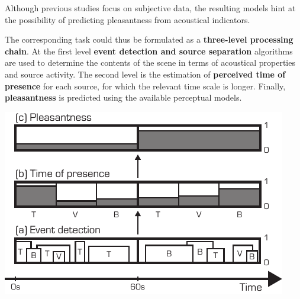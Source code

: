 \documentclass[a0,portrait]{a0poster}
\begin{document}
\begin{multicols}{2}
Although previous studies focus on subjective data, the resulting models hint at the possibility of predicting pleasantness from acoustical indicators.


\vspace{1cm}


\begin{center}

\end{center}
\vspace{1cm}

The corresponding task could thus be formulated as a \textbf{three-level processing chain}. At the first level \textbf{event detection and source separation} algorithms are used to determine the contents of the scene in terms of acoustical properties and source activity. The second level is the estimation of \textbf{perceived time of presence} for each source, for which the relevant time scale is longer. Finally, \textbf{pleasantness} is predicted using the available perceptual models.


\begin{center}\vspace{1cm}
\includegraphics[width=0.65\linewidth]{block.pdf}
\end{center}


\end{multicols}
\end{document}
